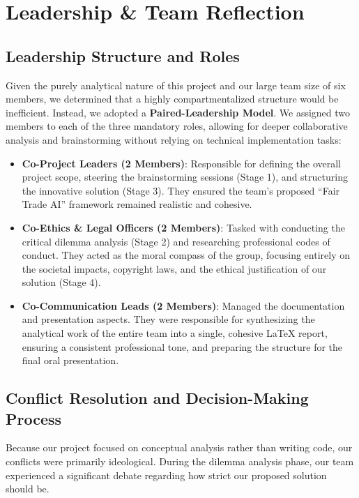 \newpage
\section{Leadership \& Team Reflection}

\subsection{Leadership Structure and Roles}
Given the purely analytical nature of this project and our large team size of six members, we determined that a highly compartmentalized structure would be inefficient. Instead, we adopted a \textbf{Paired-Leadership Model}. We assigned two members to each of the three mandatory roles, allowing for deeper collaborative analysis and brainstorming without relying on technical implementation tasks:
\begin{itemize}
    \item \textbf{Co-Project Leaders (2 Members)}: Responsible for defining the overall project scope, steering the brainstorming sessions (Stage 1), and structuring the innovative solution (Stage 3). They ensured the team's proposed ``Fair Trade AI'' framework remained realistic and cohesive.
    \item \textbf{Co-Ethics \& Legal Officers (2 Members)}: Tasked with conducting the critical dilemma analysis (Stage 2) and researching professional codes of conduct. They acted as the moral compass of the group, focusing entirely on the societal impacts, copyright laws, and the ethical justification of our solution (Stage 4).
    \item \textbf{Co-Communication Leads (2 Members)}: Managed the documentation and presentation aspects. They were responsible for synthesizing the analytical work of the entire team into a single, cohesive LaTeX report, ensuring a consistent professional tone, and preparing the structure for the final oral presentation.
\end{itemize}

\subsection{Conflict Resolution and Decision-Making Process}
Because our project focused on conceptual analysis rather than writing code, our conflicts were primarily ideological. During the dilemma analysis phase, our team experienced a significant debate regarding how strict our proposed solution should be. \\

